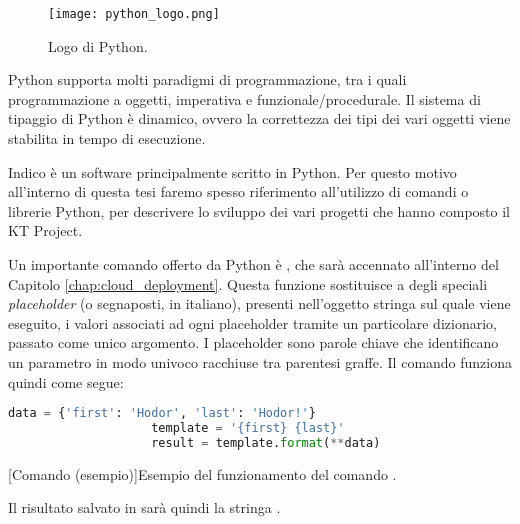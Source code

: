         	\begin{figure}[h!]
        		\begin{center}
        			\texttt{[image: python\_logo.png]}
        		\end{center}
        		\caption[Logo di Python]{Logo di Python.}
        		\label{fig:python_logo}
        	\end{figure}
        	
        	Python supporta molti paradigmi di programmazione, tra i quali programmazione a oggetti, imperativa e funzionale/procedurale. Il sistema di tipaggio di Python è dinamico, ovvero la correttezza dei tipi dei vari oggetti viene stabilita in tempo di esecuzione.
        	
        	Indico è un software principalmente scritto in Python. Per questo motivo all'interno di questa tesi faremo spesso riferimento all'utilizzo di comandi o librerie Python, per descrivere lo sviluppo dei vari progetti che hanno composto il KT Project.
        
            Un importante comando offerto da Python è , che sarà accennato all'interno del Capitolo \ref{chap:cloud_deployment}. Questa funzione sostituisce a degli speciali \textit{placeholder} (o segnaposti, in italiano), presenti nell'oggetto stringa sul quale viene eseguito, i valori associati ad ogni placeholder tramite un particolare dizionario, passato come unico argomento. I placeholder sono parole chiave che identificano un parametro in modo univoco racchiuse tra parentesi graffe. Il comando  funziona quindi come segue:
            
            \begin{center}
                \begin{lstlisting}[language=python, gobble=18]
                    data = {'first': 'Hodor', 'last': 'Hodor!'}
                    template = '{first} {last}'
                    result = template.format(**data)
                \end{lstlisting}
                \captionsetup{textformat=empty,labelformat=empty} \vspace{-2em}
                [Comando  (esempio)]{Esempio del funzionamento del comando .}
            \end{center}
            
            Il risultato salvato in  sarà quindi la stringa .
        
